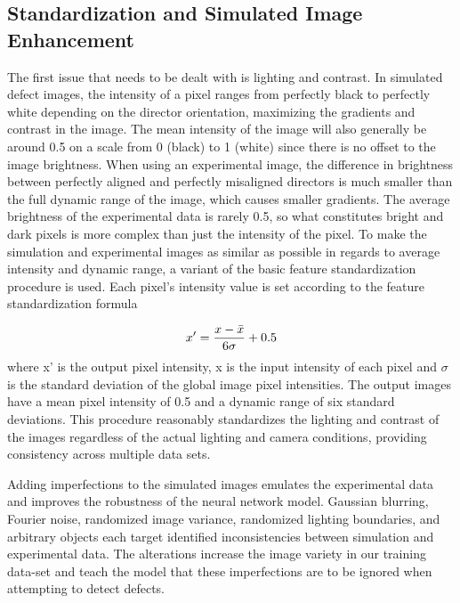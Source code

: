 \documentclass[twoside,twocolumn,9pt]{article}
\begin{document}
\subsection{Standardization and Simulated Image Enhancement}

The first issue that needs to be dealt with is lighting and contrast. In simulated defect images, the intensity of a pixel ranges from perfectly black to perfectly white depending on the director orientation, maximizing the gradients and contrast in the image. The mean intensity of the image will also generally be around 0.5 on a scale from 0 (black) to 1 (white) since there is no offset to the image brightness. When using an experimental image, the difference in brightness between perfectly aligned and perfectly misaligned directors is much smaller than the full dynamic range of the image, which causes smaller gradients. The average brightness of the experimental data is rarely 0.5, so what constitutes bright and dark pixels is more complex than just the intensity of the pixel. To make the simulation and experimental images as similar as possible in regards to average intensity and dynamic range, a variant of the basic feature standardization procedure\cite{aksoy_feature_2001} is used. Each pixel's intensity value is set according to the feature standardization formula

\begin{equation}
 x' = \frac{x - \Bar{x}}{6\sigma} +0.5
\end{equation}
where x' is the output pixel intensity, x is the input intensity of each pixel and $\sigma$ is the standard deviation of the global image pixel intensities. The output images have a mean pixel intensity of 0.5 and a dynamic range of six standard deviations. This procedure reasonably standardizes the lighting and contrast of the images regardless of the actual lighting and camera conditions, providing consistency across multiple data sets.

Adding imperfections to the simulated images emulates the experimental data and improves the robustness\cite{goodfellow_explaining_2014, bishop_training_1995} of the neural network model. Gaussian blurring, Fourier noise, randomized image variance, randomized lighting boundaries, and arbitrary objects each target identified inconsistencies between simulation and experimental data. The alterations increase the image variety in our training data-set and teach the model that these imperfections are to be ignored when attempting to detect defects.
\end{document}
